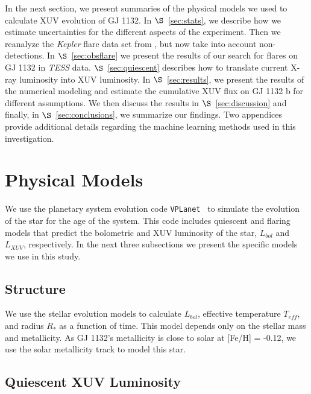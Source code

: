 \documentclass[preprint]{aastex631}
\newcommand{\link}[1]{{\small{\texttt{\underline{#1}}}}}
\def\tess{{\it TESS}\xspace}
\def\kepler{{\it Kepler}\xspace}
\def\vplanet{\texttt{\footnotesize{VPLanet}}\xspace}
\begin{document}
In the next section, we present summaries of the physical models we used to calculate XUV evolution of GJ 1132. In $\S$~\ref{sec:stats}, we describe how we estimate uncertainties for the different aspects of the experiment. Then we reanalyze the \kepler flare data set from \citet{Davenport19}, but now take into account non-detections.  In $\S$~\ref{sec:obsflare} we present the results of our search for flares on GJ 1132 in \tess data. $\S$~\ref{sec:quiescent} describes how to translate current X-ray luminosity into XUV luminosity. In $\S$~\ref{sec:results}, we present the results of the numerical modeling and estimate the cumulative XUV flux on GJ 1132 b for different assumptions. We then discuss the results in $\S$~\ref{sec:discussion} and finally, in $\S$~\ref{sec:conclusions}, we summarize our findings. Two appendices provide additional details regarding the machine learning methods used in this investigation.


\section{Physical Models\label{sec:models}}

We use the planetary system evolution code \vplanet~\citep{Barnes20} to simulate the evolution of the star for the age of the system. This code includes quiescent and flaring models that predict the bolometric and XUV luminosity of the star, $L_{bol}$ and $L_{XUV}$, respectively. In the next three subsections we present the specific models we use in this study.


\subsection{Structure\label{sec:starstructure}}

We use the \cite{Baraffe15} stellar evolution models to calculate $L_{bol}$, effective temperature $T_{eff}$, and radius $R_*$ as a function of time. This model depends only on the stellar mass and metallicity. As GJ 1132's metallicity is close to solar at [Fe/H] = -0.12, we use the solar metallicity track to model this star.

\subsection{Quiescent XUV Luminosity\label{sec:quiescencemodel}}
\end{document}
